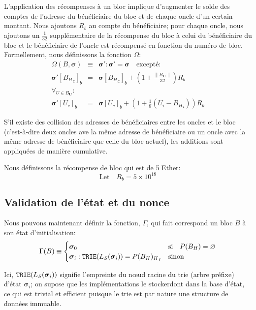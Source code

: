 \documentclass[9pt,oneside]{amsart}
\begin{document}
\begin{multicols}{2}
L'application des récompenses à un bloc implique d'augmenter le solde des comptes de l'adresse du bénéficiaire du bloc et de chaque oncle d'un certain montant. Nous ajoutons $R_b$ au compte du bénéficiaire; pour chaque oncle, nous ajoutons un $\frac{1}{32}$ supplémentaire de la récompense du bloc à celui du bénéficiaire du bloc et le bénéficiaire de l'oncle est récompensé en fonction du numéro de bloc. Formellement, nous définissons la fonction $\Omega$:
\begin{eqnarray}
\Omega(B, \boldsymbol{\sigma}) & \equiv & \boldsymbol{\sigma}': \boldsymbol{\sigma}' = \boldsymbol{\sigma} \quad \text{excepté:} \\
\boldsymbol{\sigma}'[{B_H}_c]_b & = & \boldsymbol{\sigma}[{B_H}_c]_b + (1 + \frac{\lVert B_\mathbf{U}\rVert}{32})R_b \\
\forall_{U \in B_\mathbf{U}}: \\ \nonumber
 \boldsymbol{\sigma}'[U_c]_b & = & \boldsymbol{\sigma}[U_c]_b + (1 + \frac{1}{8} (U_i - {B_H}_i)) R_b
\end{eqnarray}

S'il existe des collision des adresses de bénéficiaires entre les oncles et le bloc (c'est-à-dire deux oncles ave la même adresse de bénéficiaire ou un oncle avec la même adresse de bénéficiaire que celle du bloc actuel), les additions sont appliquées de manière cumulative.

Nous définissons la récompense de bloc qui est de 5 Ether:
\begin{equation}
\text{Let} \quad R_b = 5 \times 10^{18}
\end{equation}

\subsection{Validation de l'état et du nonce}\label{sec:statenoncevalidation}

Nous pouvons maintenant définir la fonction, $\Gamma$, qui fait correspond un bloc $B$ à son état d'initialisation:
\begin{equation}
\Gamma(B) \equiv \begin{cases}
\boldsymbol{\sigma}_0 & \text{si} \quad P(B_H) = \varnothing \\
\boldsymbol{\sigma}_i: \mathtt{\small TRIE}(L_S(\boldsymbol{\sigma}_i)) = {P(B_H)_H}_r & \text{sinon}
\end{cases}
\end{equation}

Ici, $\mathtt{\small TRIE}(L_S(\boldsymbol{\sigma}_i))$ signifie l'empreinte du n\oe{}ud racine du trie (arbre préfixe) d'état $\boldsymbol{\sigma}_i$; on supose que les implémentations le stockerdont dans la base d'état, ce qui est trivial et efficient puisque le trie est par nature une structure de données immuable.


\end{multicols}
\end{document}
